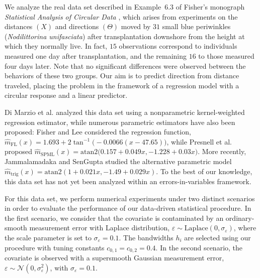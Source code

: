 \documentclass[11pt,a4paper,openany]{article}
\newcommand{\Atan}{\mbox{atan2}}
\begin{document}
We analyze the real data set described in Example~$6.3$ of Fisher's monograph \textit{Statistical Analysis of Circular Data} \cite{Fisher:1993}, which arises from experiments on the distances $(X)$ and directions $(\Theta)$ moved by $31$ small blue periwinkles (\textit{Nodilittorina unifasciata}) after transplantation downshore from the height at which they normally live. In fact, $15$ observations correspond to individuals measured one day after transplantation, and the remaining $16$ to those measured four days later. Note that no significant differences were observed between the behaviors of these two groups. Our aim is to predict direction from distance traveled, placing the problem in the framework of a regression model with a circular response and a linear predictor.   

Di Marzio et al. \cite{Marzio-Panzera-Taylor} analyzed this data set using a nonparametric kernel-weighted regression estimator, while numerous parametric estimators have also been proposed: Fisher and Lee \cite{Fisher-Lee:1992} considered the regression function, $\widehat{m}_{\textrm{FL}}(x) = 1.693 + 2 \tan^{-1} \big( -0.0066 ( x - 47.65) \big)$, while Presnell et al. \cite{Presnell} proposed $\widehat{m}_{\textrm{SPML}}(x) = \Atan \big( 0.157 + 0.049 x,  - 1.228 + 0.03 x \big) $.  More recently, Jammalamadaka and SenGupta \cite{book:Jammalamadaka-SenGupta} studied the alternative parametric model $
\widehat{m}_{\textrm{trig}}(x) = \Atan(1 + 0.021x, - 1.49 + 0.029x)$.  
To the best of our knowledge, this data set has not yet been analyzed within an errors-in-variables framework.




For this data set, we perform numerical experiments under two distinct scenarios in order to evaluate the performance of our data-driven statistical procedure.
In the first scenario, we consider that the covariate is contaminated by an ordinary-smooth measurement error with Laplace distribution, $\varepsilon \sim \textrm{Laplace}(0, \sigma_{\varepsilon})$, where the scale parameter is set to $\sigma_{\varepsilon} = 0.1$. The bandwidths $h_i$ are selected using our procedure with tuning constants $c_{0,1} = c_{0,2} = 0.4$.
In the second scenario, the covariate is observed with a supersmooth Gaussian measurement error, $\varepsilon \sim \mathcal{N}(0, \sigma_{\varepsilon}^2)$, with $\sigma_{\varepsilon} = 0.1$.
\end{document}
